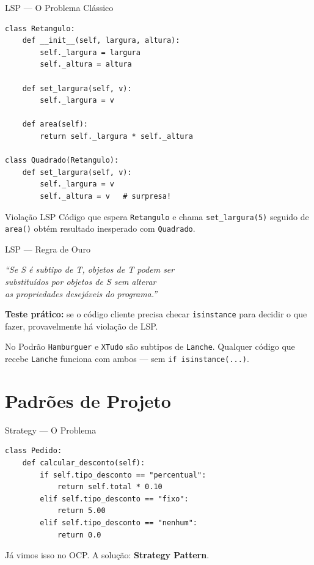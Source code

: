\documentclass[aspectratio=169]{beamer}
\begin{document}
\begin{frame}[fragile]{LSP --- O Problema Clássico}
\begin{lstlisting}
class Retangulo:
    def __init__(self, largura, altura):
        self._largura = largura
        self._altura = altura

    def set_largura(self, v):
        self._largura = v

    def area(self):
        return self._largura * self._altura

class Quadrado(Retangulo):
    def set_largura(self, v):
        self._largura = v
        self._altura = v   # surpresa!
\end{lstlisting}

\begin{alertblock}{Violação LSP}
Código que espera \texttt{Retangulo} e chama \texttt{set\_largura(5)} seguido de \texttt{area()} obtém resultado inesperado com \texttt{Quadrado}.
\end{alertblock}
\end{frame}

\begin{frame}{LSP --- Regra de Ouro}
\begin{center}
\Large
\textit{``Se S é subtipo de T, objetos de T podem ser\\
substituídos por objetos de S sem alterar\\
as propriedades desejáveis do programa.''}
\end{center}

\vspace{0.5cm}

\textbf{Teste prático:} se o código cliente precisa checar \texttt{isinstance} para decidir o que fazer, provavelmente há violação de LSP.

\begin{exampleblock}{No Podrão}
\texttt{Hamburguer} e \texttt{XTudo} são subtipos de \texttt{Lanche}. Qualquer código que recebe \texttt{Lanche} funciona com ambos --- sem \texttt{if isinstance(...)}.
\end{exampleblock}
\end{frame}

\section{Padrões de Projeto}

\begin{frame}[fragile]{Strategy --- O Problema}
\begin{lstlisting}
class Pedido:
    def calcular_desconto(self):
        if self.tipo_desconto == "percentual":
            return self.total * 0.10
        elif self.tipo_desconto == "fixo":
            return 5.00
        elif self.tipo_desconto == "nenhum":
            return 0.0
\end{lstlisting}

Já vimos isso no OCP. A solução: \textbf{Strategy Pattern}.
\end{frame}
\end{document}
